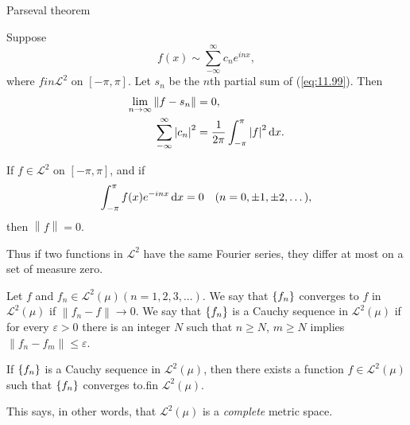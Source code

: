Parseval theorem 
\begin{thm}
    \label{thm:11.40}
    Suppose 
    \begin{equation}
        \label{eq:11.99}
        f(x) \sim \sum_{-\infty}^{\infty} c_n e^{inx} ,
    \end{equation}
    where $f in \mathscr{L}^2$ on $[-\pi, \pi]$.
    Let $s_n$ be the $n$th partial sum of (\ref{eq:11.99}).
    Then 
    \begin{align}
        \label{eq:11.100}
        \lim_{n \to \infty} \left\| f - s_n \right\| &= 0, \\
        \label{eq:11.101}
        \sum_{-\infty}^{\infty} \left| c_n \right|^2 &= 
        \frac{1}{2\pi} \int_{-\pi}^{\pi} \left| f \right|^2 \d x.
    \end{align}
\end{thm}

\begin{myCorollary*}
    If $f \in \mathscr{L}^2$ on $[-\pi, \pi]$, and if 
    \begin{equation*}
        \int_{-\pi}^{\pi} f(x) e^{-inx} \d x = 0
        \quad (n = 0, \pm 1, \pm 2, \dots),
    \end{equation*}
    then $\left\| f \right\| = 0$.
\end{myCorollary*}

Thus if two functions in $\mathscr{L}^2$ have the same Fourier series, 
they differ at most on a set of measure zero.

\begin{mydef}
    \label{mydef:11.41}
    Let $f$ and $f_n \in \mathscr{L}^2(\mu) (n = 1, 2, 3, ... )$. 
    We say that $\protect\{f_n\}$ converges to $f$ in $\mathscr{L}^2(\mu)$ if $\left\| f_n - f \right\| \rightarrow 0$. 
    We say that $\protect\{f_n\}$ is a Cauchy sequence in $\mathscr{L}^2(\mu)$ if for every $\varepsilon > 0$ there is an integer $N$ such that $n \geq N$, $m \geq N$ implies $\left\| f_n - f_m \right\| \leq \varepsilon$.
\end{mydef}

\begin{thm}
    \label{thm:11.42}
    If $\protect\{f_n\}$ is a Cauchy sequence in $\mathscr{L}^2(\mu)$, 
    then there exists a function $f \in \mathscr{L}^2(\mu)$ 
    such that $\protect\{f_n\}$ converges to.fin $\mathscr{L}^2(\mu)$.
\end{thm}

This says, in other words, that $\mathscr{L}^2(\mu)$ is a \emph{complete} metric space.

